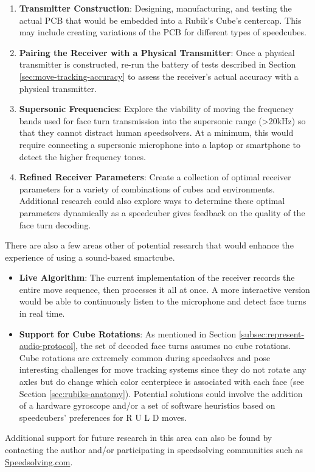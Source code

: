 \begin{enumerate}

    \item \textbf{Transmitter Construction}: Designing, manufacturing,
    and testing the actual PCB that would be embedded into a Rubik's
    Cube's centercap. This may include creating variations of the PCB
    for different types of speedcubes.

    \item \textbf{Pairing the Receiver with a Physical Transmitter}: Once
    a physical transmitter is constructed, re-run the battery of tests
    described in Section \ref{sec:move-tracking-accuracy} to assess the
    receiver's actual accuracy with a physical transmitter.

    \item \textbf{Supersonic Frequencies}: Explore the viability of
    moving the frequency bands used for face turn transmission into the
    supersonic range (>20kHz) so that they cannot distract human
    speedsolvers. At a minimum, this would require connecting a
    supersonic microphone into a laptop or smartphone to detect the
    higher frequency tones.

    \item \textbf{Refined Receiver Parameters}: Create a collection of
    optimal receiver parameters for a variety of combinations of cubes
    and environments. Additional research could also explore ways to
    determine these optimal parameters dynamically as a speedcuber
    gives feedback on the quality of the face turn decoding.

\end{enumerate}

There are also a few areas other of potential research that would
enhance the experience of using a sound-based smartcube.

\begin{itemize}

    \item \textbf{Live Algorithm}: The current implementation of the
    receiver records the entire move sequence, then processes it all at
    once. A more interactive version would be able to continuously
    listen to the microphone and detect face turns in real time.

    \item \textbf{Support for Cube Rotations}: As mentioned in Section
    \ref{subsec:represent-audio-protocol}, the set of decoded face
    turns assumes no cube rotations. Cube rotations are extremely
    common during speedsolves and pose interesting challenges for move
    tracking systems since they do not rotate any axles but do change
    which color centerpiece is associated with each face (see Section
    \ref{sec:rubiks-anatomy}). Potential solutions could involve the
    addition of a hardware gyroscope and/or a set of software
    heuristics based on speedcubers' preferences for R U L D moves.

\end{itemize}

Additional support for future research in this area can also be found
by contacting the author and/or participating in speedsolving
communities such as
\href{https://www.speedsolving.com/}{Speedsolving.com}.